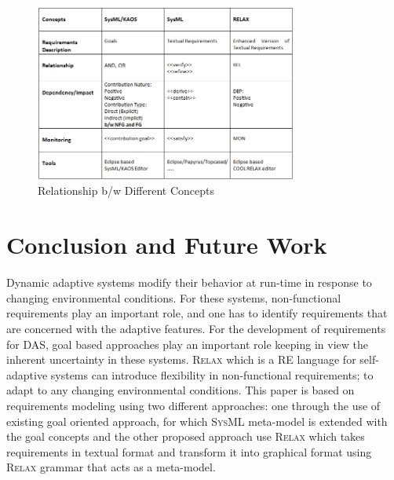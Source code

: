\documentclass[10pt, conference, compsocconf]{IEEEtran}
\def\myrelax{\textsc{Relax}}                  %
\def\sysml{\textsc{SysML}}
\begin{document}
\begin{figure}[!t]
\centering
\includegraphics[width=3.4in]{fig13}
\caption{Relationship b/w Different Concepts}
\label{fig:Relationship}
\end{figure}

\section{Conclusion and Future Work}\label{sec:Conclusion and Future Work}

Dynamic adaptive systems modify their behavior at run-time in response to changing environmental conditions. For these systems, non-functional requirements play an important role, and one has to identify requirements that are concerned with the adaptive features. For the development of requirements for DAS, goal based approaches play an important role keeping in view the inherent uncertainty in these systems. \myrelax{} which is a RE language for self-adaptive systems can introduce flexibility in non-functional requirements; to adapt to any changing environmental conditions. This paper is based on requirements modeling using two different approaches: one through the use of existing goal oriented approach, for which \sysml{} meta-model is extended with the goal concepts and the other proposed approach use \myrelax{} which takes requirements in textual format and transform it into graphical format using \myrelax{} grammar that acts as a meta-model. 
\end{document}
